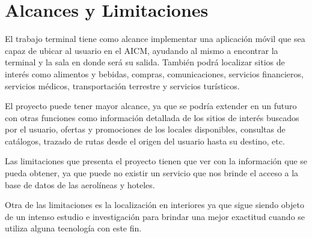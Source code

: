 \section{Alcances y Limitaciones}

El trabajo terminal tiene como alcance implementar una aplicación móvil que sea capaz de ubicar al usuario en el AICM, ayudando al mismo a encontrar la terminal y la sala en donde será su salida. También podrá localizar sitios de interés como alimentos y bebidas, compras, comunicaciones, servicios financieros,  servicios médicos, transportación terrestre y servicios turísticos.

El proyecto puede tener mayor alcance, ya que se podría extender en un futuro con otras funciones como información detallada de los sitios de interés buscados por el usuario, ofertas y promociones de los locales disponibles, consultas de catálogos, trazado de rutas desde el origen del usuario hasta su destino, etc.

Las limitaciones que presenta el proyecto tienen que ver con la información que se pueda obtener, ya que puede no existir un servicio que nos brinde el acceso a la base de datos de las aerolíneas y hoteles. 

Otra de las limitaciones es la localización en interiores ya que sigue siendo objeto de un intenso estudio e investigación para brindar una mejor exactitud cuando se utiliza alguna tecnología con este fin.

